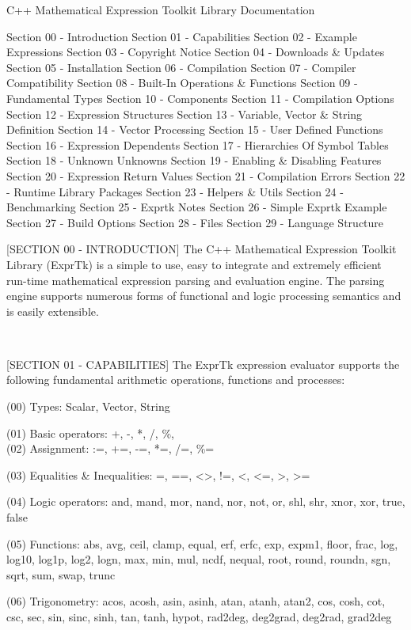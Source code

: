 
C++ Mathematical Expression Toolkit Library Documentation

Section 00 - Introduction
Section 01 - Capabilities
Section 02 - Example Expressions
Section 03 - Copyright Notice
Section 04 - Downloads \& Updates
Section 05 - Installation
Section 06 - Compilation
Section 07 - Compiler Compatibility
Section 08 - Built-In Operations \& Functions
Section 09 - Fundamental Types
Section 10 - Components
Section 11 - Compilation Options
Section 12 - Expression Structures
Section 13 - Variable, Vector \& String Definition
Section 14 - Vector Processing
Section 15 - User Defined Functions
Section 16 - Expression Dependents
Section 17 - Hierarchies Of Symbol Tables
Section 18 - Unknown Unknowns
Section 19 - Enabling \& Disabling Features
Section 20 - Expression Return Values
Section 21 - Compilation Errors
Section 22 - Runtime Library Packages
Section 23 - Helpers \& Utils
Section 24 - Benchmarking
Section 25 - Exprtk Notes
Section 26 - Simple Exprtk Example
Section 27 - Build Options
Section 28 - Files
Section 29 - Language Structure


[SECTION 00 - INTRODUCTION]
The C++ Mathematical Expression  Toolkit Library (ExprTk) is  a simple
to  use,   easy  to   integrate  and   extremely  efficient   run-time
mathematical  expression parsing  and evaluation  engine. The  parsing
engine  supports numerous  forms  of  functional and  logic processing
semantics and is easily extensible.

~~~~~~~~~~~~~~~~~~~~~~~~~~~~~~~~~~~~~~~~~~~~~~~~~~~~~~~~~~

[SECTION 01 - CAPABILITIES]
The  ExprTk expression  evaluator supports  the following  fundamental
arithmetic operations, functions and processes:

(00) Types:           Scalar, Vector, String

(01) Basic operators: +, -, *, /, \%, \^\\

(02) Assignment:      :=, +=, -=, *=, /=, \%=

(03) Equalities \&
Inequalities:    =, ==, <>, !=, <, <=, >, >=

(04) Logic operators: and, mand, mor, nand, nor, not, or, shl, shr,
xnor, xor, true, false

(05) Functions:       abs, avg, ceil, clamp, equal, erf, erfc,  exp,
expm1, floor, frac,  log, log10, log1p,  log2,
logn,  max,  min,  mul,  ncdf,  nequal,  root,
round, roundn, sgn, sqrt, sum, swap, trunc

(06) Trigonometry:    acos, acosh, asin, asinh, atan, atanh,  atan2,
cos,  cosh, cot,  csc, sec,  sin, sinc,  sinh,
tan, tanh, hypot, rad2deg, deg2grad,  deg2rad,
grad2deg


